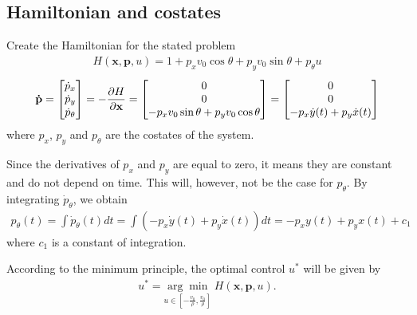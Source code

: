 \documentclass[12pt]{article}
\begin{document}
\subsection{Hamiltonian and costates}

Create the Hamiltonian for the stated problem
\begin{align}
    H(\mathbf{x},\mathbf{p},u) = 1 + p_xv_0\cos\theta + p_yv_0\sin\theta + p_\theta u
\end{align}
\begin{align}
    \mathbf{\dot{p}} = \begin{bmatrix}
        \dot{p}_x\\\dot{p}_y\\\dot{p}_\theta
    \end{bmatrix}
    = -\pdv{H}{\mathbf{x}}
    = \begin{bmatrix}
        0\\0\\-p_xv_0\sin\theta + p_yv_0\cos\theta
    \end{bmatrix}
    = \begin{bmatrix}
        0\\0\\-p_x \dot{y}(t) + p_y\dot{x}(t)
    \end{bmatrix}
\end{align}
where $p_x$, $p_y$ and $p_\theta$ are the costates of the system.

Since the derivatives of $p_x$ and $p_y$ are equal to zero, it means they are constant and do not depend on time. This will, however, not be the case for $p_\theta$. By integrating $\dot{p}_\theta$, we obtain
\begin{align}
    p_\theta(t) = \int \dot{p}_\theta(t)dt
    = \int (-p_x \dot{y}(t) + p_y\dot{x}(t))dt
    = -p_x y(t) + p_yx(t) + c_1
    \label{eq_ptheta}
\end{align}
where $c_1$ is a constant of integration.

According to the minimum principle, the optimal control $u^*$ will be given by
\begin{align}
    u^* = \underset{ u \in \left[-\frac{v_0}{\rho},\frac{v_0}{\rho}\right] }{\arg\min} \; H(\mathbf{x},\mathbf{p},u).
\end{align}
\end{document}
